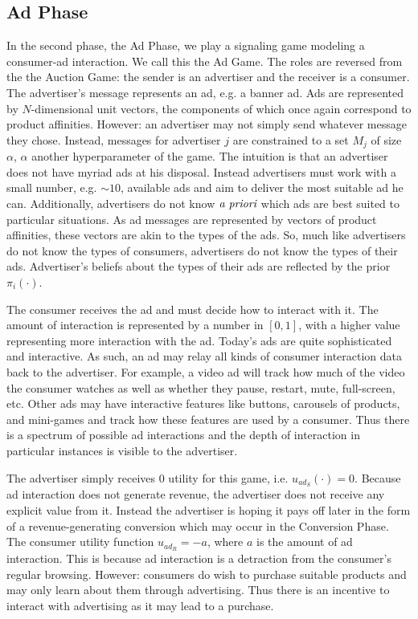 \documentclass{article}
\begin{document}
\subsection{Ad Phase}

In the second phase, the Ad Phase, we play a signaling game modeling a consumer-ad interaction. We call this the Ad Game. The roles are reversed from the the Auction Game: the sender is an advertiser and the receiver is a consumer. The advertiser's message represents an ad, e.g. a banner ad. Ads are represented by $N$-dimensional unit vectors, the components of which once again correspond to product affinities. However: an advertiser may not simply send whatever message they chose. Instead, messages for advertiser $j$ are constrained to a set $M_j$ of size $\alpha$, $\alpha$ another hyperparameter of the game. The intuition is that an advertiser does not have myriad ads at his disposal. Instead advertisers must work with a small number, e.g. $\sim 10$, available ads and aim to deliver the most suitable ad he can. Additionally, advertisers do not know $\emph{a priori}$ which ads are best suited to particular situations. As ad messages are represented by vectors of product affinities, these vectors are akin to the types of the ads. So, much like advertisers do not know the types of consumers, advertisers do not know the types of their ads. Advertiser's beliefs about the types of their ads are reflected by the prior $\pi_i(\cdot)$.

The consumer receives the ad and must decide how to interact with it. The amount of interaction is represented by a number in $[0,1]$, with a higher value representing more interaction with the ad. Today's ads are quite sophisticated and interactive. As such, an ad may relay all kinds of consumer interaction data back to the advertiser. For example, a video ad will track how much of the video the consumer watches as well as whether they pause, restart, mute, full-screen, etc. Other ads may have interactive features like buttons, carousels of products, and mini-games and track how these features are used by a consumer. Thus there is a spectrum of possible ad interactions and the depth of interaction in particular instances is visible to the advertiser.

The advertiser simply receives 0 utility for this game, i.e. $u_{ad_S}(\cdot) = 0$. Because ad interaction does not generate revenue, the advertiser does not receive any explicit value from it. Instead the advertiser is hoping it pays off later in the form of a revenue-generating conversion which may occur in the Conversion Phase. The consumer utility function $u_{ad_R} = -a$, where $a$ is the amount of ad interaction. This is because ad interaction is a detraction from the consumer's regular browsing. However: consumers do wish to purchase suitable products and may only learn about them through advertising. Thus there is an incentive to interact with advertising as it may lead to a purchase.
\end{document}

